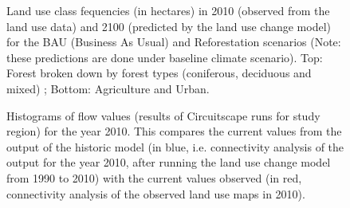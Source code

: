 
\begin{figure}[h!]
 \caption[Land use class fequencies in 2010 and 2100 for the BAU and Reforestation scenarios ]{Land use class fequencies (in hectares) in 2010 (observed from the land use data) and 2100 (predicted by the land use change model) for the BAU (Business As Usual) and Reforestation scenarios (Note: these predictions are done under baseline climate scenario). Top: Forest broken down by forest types (coniferous, deciduous and mixed) ; Bottom: Agriculture and Urban.}
 \label{fig:bar_both}
\end{figure}


\begin{figure}[h!]
 \caption[Histograms of flow values for 2010 comparing the historic model run (1990-2010) with observations]{Histograms of flow values (results of Circuitscape runs for study region) for the year 2010. This compares the current values from the output of the historic model (in blue, i.e. connectivity analysis of the output for the year 2010, after running the land use change model from 1990 to 2010) with the current values observed (in red, connectivity analysis of the observed land use maps in 2010).}
 \label{fig:hist_historic}
\end{figure}

